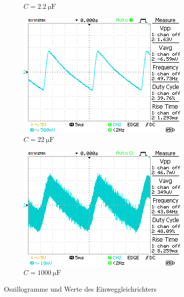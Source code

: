 \begin{figure}[H]
\begin{subfigure}[b]{0.45\textwidth}
        \caption{$C=\SI{2,2}{\micro\farad}$}
        \label{fig:3_C1}
    \end{subfigure}
    \vspace{0.5em}
    \begin{subfigure}[b]{0.45\textwidth}
        \includegraphics[width=\textwidth]{figs/3/DS0011.png}
        \caption{$C=\SI{22}{\micro\farad}$}
        \label{fig:3_C2}
    \end{subfigure}
    \hfill
    \begin{subfigure}[b]{0.45\textwidth}
        \includegraphics[width=\textwidth]{figs/3/DS0012.png}
        \caption{$C=\SI{1000}{\micro\farad}$}
        \label{fig:3_C3}
    \end{subfigure}
    \caption{Oszillogramme und Werte des Einweggleichrichters}
\end{figure}

